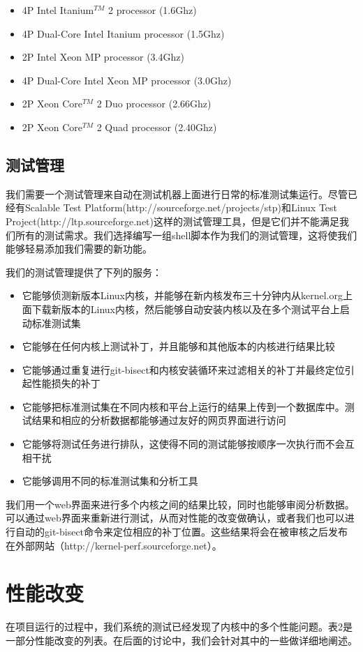 \begin{itemize}
\item 4P Intel Itanium$^{TM}$ 2 processor (1.6Ghz)
\item 4P Dual-Core Intel Itanium processor (1.5Ghz) 
\item 2P Intel Xeon MP processor (3.4Ghz)
\item 4P Dual-Core Intel Xeon MP processor (3.0Ghz) 
\item 2P Xeon Core$^{TM}$ 2 Duo processor (2.66Ghz)
\item 2P Xeon Core$^{TM}$ 2 Quad processor (2.40Ghz)
\end{itemize}
\subsection{测试管理}
我们需要一个测试管理来自动在测试机器上面进行日常的标准测试集运行。尽管已经有Scalable Test Platform(http://sourceforge.net/projects/stp)和Linux Test Project(http://ltp.sourceforge.net)这样的测试管理工具，但是它们并不能满足我们所有的测试需求。我们选择编写一组shell脚本作为我们的测试管理，这将使我们能够轻易添加我们需要的新功能。

我们的测试管理提供了下列的服务：
\begin{itemize}
\item 它能够侦测新版本Linux内核，并能够在新内核发布三十分钟内从kernel.org上面下载新版本的Linux内核，然后能够自动安装内核以及在多个测试平台上启动标准测试集
\item 它能够在任何内核上测试补丁，并且能够和其他版本的内核进行结果比较
\item 它能够通过重复进行git-bisect和内核安装循环来过滤相关的补丁并最终定位引起性能损失的补丁
\item 它能够把标准测试集在不同内核和平台上运行的结果上传到一个数据库中。测试结果和相应的分析数据都能够通过友好的网页界面进行访问
\item 它能够将测试任务进行排队，这使得不同的测试能够按顺序一次执行而不会互相干扰
\item 它能够调用不同的标准测试集和分析工具
\end{itemize}

我们用一个web界面来进行多个内核之间的结果比较，同时也能够审阅分析数据。可以通过web界面来重新进行测试，从而对性能的改变做确认，或者我们也可以进行自动的git-bisect命令来定位相应的补丁位置。这些结果将会在被审核之后发布在外部网站（http://kernel-perf.sourceforge.net）。


\section{性能改变}
在项目运行的过程中，我们系统的测试已经发现了内核中的多个性能问题。表2是一部分性能改变的列表。在后面的讨论中，我们会针对其中的一些做详细地阐述。
